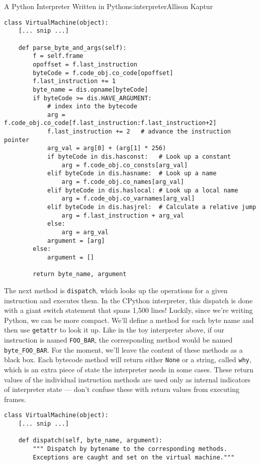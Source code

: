 \begin{aosachapter}{A Python Interpreter Written in Python}{s:interpreter}{Allison Kaptur}
\begin{verbatim}
class VirtualMachine(object):
    [... snip ...]

    def parse_byte_and_args(self):
        f = self.frame
        opoffset = f.last_instruction
        byteCode = f.code_obj.co_code[opoffset]
        f.last_instruction += 1
        byte_name = dis.opname[byteCode]
        if byteCode >= dis.HAVE_ARGUMENT:
            # index into the bytecode
            arg = f.code_obj.co_code[f.last_instruction:f.last_instruction+2]  
            f.last_instruction += 2   # advance the instruction pointer
            arg_val = arg[0] + (arg[1] * 256)
            if byteCode in dis.hasconst:   # Look up a constant
                arg = f.code_obj.co_consts[arg_val]
            elif byteCode in dis.hasname:  # Look up a name
                arg = f.code_obj.co_names[arg_val]
            elif byteCode in dis.haslocal: # Look up a local name
                arg = f.code_obj.co_varnames[arg_val]
            elif byteCode in dis.hasjrel:  # Calculate a relative jump
                arg = f.last_instruction + arg_val
            else:
                arg = arg_val
            argument = [arg]
        else:
            argument = []

        return byte_name, argument
\end{verbatim}

The next method is \texttt{dispatch}, which looks up the operations for
a given instruction and executes them. In the CPython interpreter, this
dispatch is done with a giant switch statement that spans 1,500 lines!
Luckily, since we're writing Python, we can be more compact. We'll
define a method for each byte name and then use \texttt{getattr} to look
it up. Like in the toy interpreter above, if our instruction is named
\texttt{FOO\_BAR}, the corresponding method would be named
\texttt{byte\_FOO\_BAR}. For the moment, we'll leave the content of
these methods as a black box. Each bytecode method will return either
\texttt{None} or a string, called \texttt{why}, which is an extra piece
of state the interpreter needs in some cases. These return values of the
individual instruction methods are used only as internal indicators of
interpreter state --- don't confuse these with return values from
executing frames.

\begin{verbatim}
class VirtualMachine(object):
    [... snip ...]

    def dispatch(self, byte_name, argument):
        """ Dispatch by bytename to the corresponding methods.
        Exceptions are caught and set on the virtual machine."""


\end{verbatim}
\end{aosachapter}
